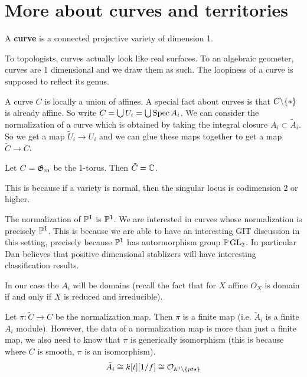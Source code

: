 \documentclass[12pt]{article}
\begin{document}
\section{More about curves and territories}
\begin{definition}
    A \textbf{curve} is a connected projective variety of dimension 1.
\end{definition}

To topologists, curves actually look like real surfaces. To an algebraic geometer, curves are 1 dimensional and we draw them as such.
The loopiness of a curve is supposed to reflect its genus.

A curve $C$ is locally a union of affines. A special fact about curves is that $C\backslash\set{*}$ is already affine. 
So write $C = \bigcup U_i = \bigcup \Spec A_i$. We can consider the normalization of a curve which is obtained by 
taking the integral closure $A_i\subset \tilde{A}_i$. So we get a map $\tilde U_i\to U_i$ and we can glue these 
maps together to get a map $\tilde C\to C$.

\begin{example}
    Let $C = \mf G_m$ be the 1-torus. Then $\tilde C = \C$.
\end{example}

\begin{example}
     This is because if a variety is normal, then the singular locus is 
    codimension 2 or higher.
\end{example}

\begin{example}
    The normalization of $\P^1$ is $\P^1$. We are interested in curves whose normalization is precisely $\P^1$. 
    This is because we are able to have an interesting GIT discussion in this setting, precisely because $\P^1$ has 
    autormorphism group $\P\GL_2$. In particular Dan believes that positive dimensional stablizers will have interesting 
    classification results.
\end{example}

In our case the $A_i$ will be domains (recall the fact that for $X$ affine $O_X$ is domain 
if and only if $X$ is reduced and irreducible).

Let $\pi:\tilde C\to C$ be the normalization map. Then $\pi$ is a finite map 
(i.e. $\tilde A_i$ is a finite $A_i$ module). However, the data of a normalization map is more than just a finite map,
we also need to know that $\pi$ is generically isomorphism (this is because where $C$ is smooth, $\pi$ is an isomorphism).
 \begin{align*}
    \tilde A_i \cong k[t][1/f] \cong \mc O_{\A^1\backslash\set{pts}}
\end{align*}
\end{document}
